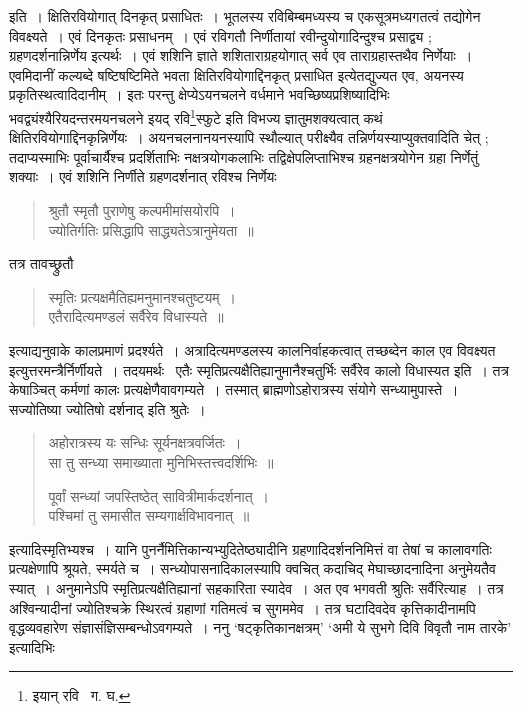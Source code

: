 \documentclass[11pt, openany]{book}
\begin{document}
\indent	इति~। क्षितिरवियोगात् दिनकृत् प्रसाधितः~। भूतलस्य रविबिम्बमध्यस्य च एकसूत्रमध्यगतत्वं तद्योगेन विवक्ष्यते~। एवं दिनकृतः
प्रसाधनम्~। एवं रविगतौ निर्णीतायां रवीन्दुयोगादिन्दुश्च प्रसाद्व्य ; ग्रहणदर्शनान्निर्णेय इत्यर्थः~। एवं शशिनि ज्ञाते शशिताराग्रहयोगात् सर्व
एव ताराग्रहास्तथैव निर्णेयाः~। एवमिदानीं कल्यब्दे षष्टिषष्टिमिते भवता क्षितिरवियोगाद्दिनकृत् प्रसाधित इत्येतद्युज्यत एव, अयनस्य प्रकृतिस्थत्वादिदानीम्~। इतः परन्तु क्षेप्येऽयनचलने वर्धमाने भवच्छिष्यप्रशिष्यादिभिः भवद्व्यंश्यैरियदन्तरमयनचलने इयद् रवि\renewcommand{\thefootnote}{१}\footnote{इयान् रवि \textendash\ ग. घ.}स्फुटे इति विभज्य ज्ञातुमशक्यत्वात् कथं क्षितिरवियोगाद्दिनकृन्निर्णेयः~। अयनचलनानयनस्यापि स्थौल्यात् परीक्ष्यैव तन्निर्णयस्याप्युक्तवादिति चेत् ; तदाप्यस्माभिः पूर्वाचार्यैश्च प्रदर्शिताभिः नक्षत्रयोगकलाभिः तद्विक्षेपलिप्ताभिश्च ग्रहनक्षत्रयोगेन ग्रहा निर्णेतुं शक्याः~। एवं शशिनि निर्णीते ग्रहणदर्शनात् रविश्च निर्णेयः\textendash 

\newpage

\begin{quote}
{\qt श्रुतौ स्मृतौ पुराणेषु कल्पमीमांसयोरपि~।\\
	ज्योतिर्गतिः प्रसिद्धापि साद्ध्यतेऽत्रानुमेयता~॥} 
\end{quote}
 
\noindent तत्र तावच्छ्रुतौ\textendash  
\begin{quote}
{\qt स्मृतिः प्रत्यक्षमैतिह्यमनुमानश्चतुष्टयम्~।\\
	एतैरादित्यमण्डलं सर्वैरेव विधास्यते~॥} 
\end{quote}
 
\noindent इत्याद्यनुवाके कालप्रमाणं प्रदर्श्यते~। अत्रादित्यमण्डलस्य कालनिर्वाहकत्वात् तच्छब्देन काल एव विवक्ष्यत इत्युत्तरमन्त्रैर्निर्णीयते~। तदयमर्थः \textendash\ एतैः स्मृतिप्रत्यक्षैतिह्यानुमानैश्चतुर्भिः सर्वैरेव कालो विधास्यत इति~। तत्र केषाञ्चित् कर्मणां कालः प्रत्यक्षेणैवावगम्यते~। {\qt तस्मात् ब्राह्मणोऽहोरात्रस्य संयोगे सन्ध्यामुपास्ते~। सज्योतिष्या ज्योतिषो दर्शनाद्} इति श्रुतेः~।

\begin{quote}
{\qt अहोरात्रस्य यः सन्धिः सूर्यनक्षत्रवर्जितः~।\\
सा तु सन्ध्या समाख्याता मुनिभिस्तत्त्वदर्शिभिः~॥

पूर्वां सन्ध्यां जपस्तिष्ठेत् सावित्रीमार्कदर्शनात्~।\\
पश्चिमां तु समासीत सम्यगार्क्षविभावनात्~॥}
\end{quote}

\noindent इत्यादिस्मृतिभ्यश्च~। यानि पुनर्नैमित्तिकान्यभ्युदितेष्ठ्यादीनि ग्रहणादिदर्शननिमित्तं वा तेषां च कालावगतिः प्रत्यक्षेणापि श्रूयते, स्मर्यते च~। सन्ध्योपासनादिकालस्यापि क्वचित् कदाचिद् मेघाच्छादनादिना अनुमेयतैव स्यात्~। अनुमानेऽपि स्मृतिप्रत्यक्षैतिह्यानां सहकारिता
स्यादेव~। अत एव भगवती श्रुतिः सर्वैरित्याह~। तत्र अश्विन्यादीनां ज्योतिश्चक्रे स्थिरत्वं ग्रहाणां गतिमत्वं च सुगममेव~। तत्र घटादिवदेव कृत्तिकादीनामपि वृद्धव्यवहारेण संज्ञासंज्ञिसम्बन्धोऽवगम्यते~। ननु `{\qt षट्कृतिकानक्षत्रम्}' `{\qt अमी ये सुभगे दिवि विवृतौ नाम तारके}' इत्यादिभिः
\end{document}
